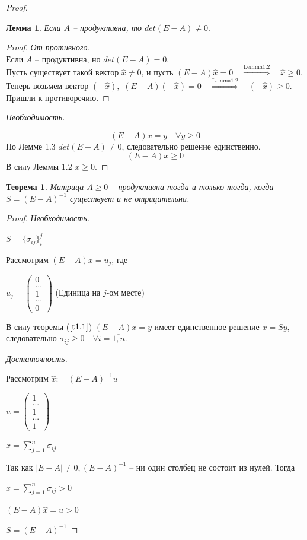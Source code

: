 \documentclass[12pt,a4paper,titlepage,oneside]{book}
\theoremstyle{definition}
\theoremstyle{plain}
\newtheorem{theorem}{Теорема}[chapter]
\theoremstyle{remark}
\theoremstyle{remark}
\theoremstyle{plain}
\newtheorem{lemma}{Лемма}[chapter]
\theoremstyle{plain}
\begin{document}
\begin{proof}
\begin{lemma}\label{l1.3}
Если $A$ -- продуктивна, то $det(E-A) \neq 0.$
\end{lemma}
\begin{proof}
\textit{От противного.}\\
Если $A$ -- продуктивна, но $det(E-A) = 0.$\\
Пусть существует такой вектор $\hat{x} \neq 0$, и пусть $(E-A)\hat{x} = 0 \quad \overset{\mathrm{Lemma 1.2}}{\Longrightarrow} \quad \hat{x} \geq 0$.\\
Теперь возьмем вектор $(-\hat{x}),$ $(E-A)(-\hat{x}) = 0 \quad \overset{\mathrm{Lemma 1.2}}{\Longrightarrow} \quad (-\hat{x}) \geq 0.$
Пришли к противоречию.
\end{proof}

\textit{Необходимость.}

$$(E-A)x=y \quad \forall y \geq 0$$
По Лемме 1.3 $det(E-A) \neq 0$, следовательно решение единственно.
$$(E-A)x \geq 0$$
В силу Леммы 1.2 $x \geq 0.$
\end{proof}

\begin{theorem}\label{t1.2}
Матрица $A \geq 0$ -- продуктивна тогда и только тогда, когда $S = (E-A)^{-1}$ существует и не отрицательна.
\end{theorem}

\begin{proof}

\textit{Необходимость.}

$S = \{ \sigma_{ij} \}_{i}^{j}$

Рассмотрим $(E-A)x = u_j$, где

$u_j = \left(\begin{array}{crl}
0\\ ... \\1\\...\\ 0
\end{array}\right)$ (Единица на $j$-ом месте)

В силу теоремы ($\ref{t1.1}$) $(E-A)x=y$ имеет единственное решение $x=Sy$, следовательно $\sigma_{ij} \geq 0 \quad \forall i = \overline{1,n}$.

\textit{Достаточность.}

Рассмотрим $\hat{x}: \quad (E-A)^{-1}u$

$u = \left(\begin{array}{crl}
1\\ ... \\1\\...\\ 1
\end{array}\right)$

$\hat{x} = \sum\limits_{j=1}^{n} \sigma_{ij}$

Так как $|E-A| \neq 0, (E-A)^{-1}$ -- ни один столбец не состоит из нулей. Тогда 

$\hat{x} = \sum\limits_{j=1}^{n} \sigma_{ij} > 0$

$(E-A)\hat{x}=u>0$

$S=(E-A)^{-1}$
\end{proof}
\end{document}
